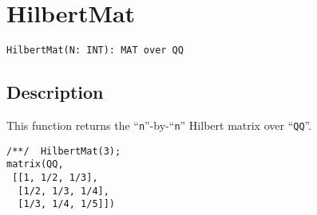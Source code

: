 \documentclass[a4paper]{mybook}
\newenvironment{command}{}{} %
\begin{document}
\section{HilbertMat}
\label{HilbertMat}
\begin{command} %


\begin{Verbatim}[label=syntax, rulecolor=\color{MidnightBlue},
frame=single]
HilbertMat(N: INT): MAT over QQ
\end{Verbatim}


\subsection*{Description}

This function returns the ``\verb&n&''-by-``\verb&n&'' Hilbert matrix over ``\verb&QQ&''.
\begin{Verbatim}[label=example, rulecolor=\color{PineGreen}, frame=single]
/**/  HilbertMat(3);
matrix(QQ,
 [[1, 1/2, 1/3],
  [1/2, 1/3, 1/4],
  [1/3, 1/4, 1/5]])
\end{Verbatim}


\end{command} %
\end{document}
